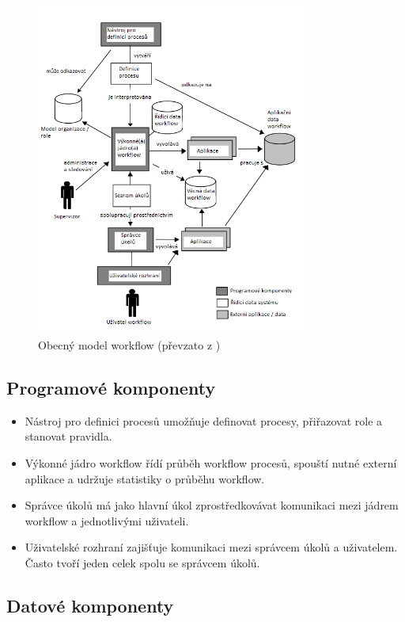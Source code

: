 \documentclass{fithesis}
\begin{document}
\begin{figure}[htp]
\centering
\includegraphics[width=340px]{images/obecny_model.png}

\caption{Obecný model workflow (převzato z \cite{wfmc})}
\label{fig:obecny_model_workflow}
\end{figure}


\subsection*{Programové komponenty}

\begin{itemize}
\item Nástroj pro definici procesů umožňuje definovat procesy, přiřazovat role a stanovat pravidla.
\item Výkonné jádro workflow řídí průběh workflow procesů, spouští nutné externí aplikace a udržuje statistiky o průběhu workflow.
\item Správce úkolů má jako hlavní úkol zprostředkovávat komunikaci mezi jádrem workflow a jednotlivými uživateli.
\item Uživatelské rozhraní zajišťuje komunikaci mezi správcem úkolů a uživatelem. Často tvoří jeden celek spolu se správcem úkolů.
\end{itemize}

\subsection*{Datové komponenty}
\end{document}
